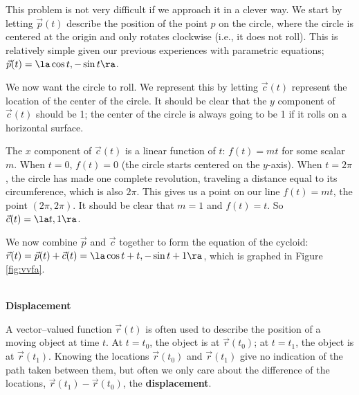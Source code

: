 {This problem is not very difficult if we approach it in a clever way. We start by letting $\vec p(t)$ describe the position of the point $p$ on the circle, where the circle is centered at the origin and only rotates clockwise (i.e., it  does not roll). This is relatively simple given our previous experiences with parametric equations; $\vec p(t) = \la \cos t, -\sin t\ra$. 

We now want the circle to roll. We represent this by letting $\vec c(t)$ represent the location of the center of the circle. It should be clear that the $y$ component of $\vec c(t)$ should be 1; the center of the circle is always going to be 1 if it rolls on a horizontal surface.

The $x$ component of $\vec c(t)$ is a linear function of $t$: $f(t) = mt$ for some scalar $m$. When $t=0$, $f(t) = 0$ (the circle starts centered on the $y$-axis). When $t=2\pi$, the circle has made one complete revolution, traveling a distance equal to its circumference, which is also $2\pi$. This gives us a point on our line $f(t) = mt$, the point $(2\pi, 2\pi)$. It should be clear that $m=1$ and $f(t) = t$. So $\vec c(t) = \la t, 1\ra$. 

We now combine $\vec p$ and $\vec c$ together to form the equation of the cycloid: $\vec r(t) = \vec p(t) + \vec c(t) = \la \cos t+ t,-\sin t+1\ra$, which is graphed in Figure \ref{fig:vvfa}. 
}\\ 

\noindent\textbf{\large Displacement}\\


A vector--valued function $\vec r(t)$ is often used to describe the position of a moving object at time $t$. At $t=t_0$, the object is at $\vec r(t_0)$; at $t=t_1$, the object is at $\vec r(t_1)$. Knowing the locations $\vec r(t_0)$ and $\vec r(t_1)$ give no indication of the path taken between them, but often we only care about the difference of the locations, $\vec r(t_1)-\vec r(t_0)$, the \textbf{displacement}.

